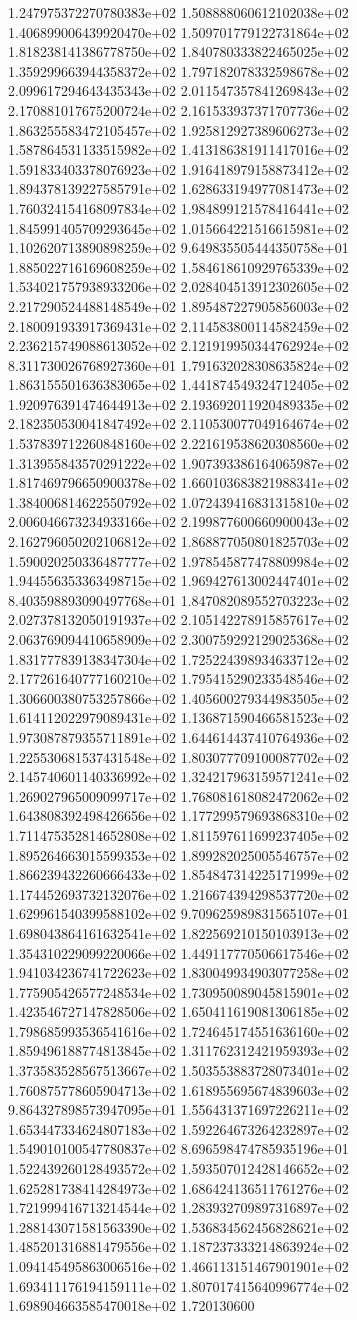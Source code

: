 1.247975372270780383e+02	1.508888060612102038e+02	1.406899006439920470e+02	1.509701779122731864e+02	1.818238141386778750e+02	1.840780333822465025e+02	1.359299663944358372e+02	1.797182078332598678e+02	2.099617294643435343e+02	2.011547357841269843e+02	2.170881017675200724e+02	2.161533937371707736e+02	1.863255583472105457e+02	1.925812927389606273e+02	1.587864531133515982e+02	1.413186381911417016e+02	1.591833403378076923e+02	1.916418979158873412e+02	1.894378139227585791e+02	1.628633194977081473e+02	1.760324154168097834e+02	1.984899121578416441e+02	1.845991405709293645e+02	1.015664221516615981e+02	1.102620713890898259e+02	9.649835505444350758e+01	1.885022716169608259e+02	1.584618610929765339e+02	1.534021757938933206e+02	2.028404513912302605e+02	2.217290524488148549e+02	1.895487227905856003e+02	2.180091933917369431e+02	2.114583800114582459e+02	2.236215749088613052e+02	2.121919950344762924e+02	8.311730026768927360e+01	1.791632028308635824e+02	1.863155501636383065e+02	1.441874549324712405e+02	1.920976391474644913e+02	2.193692011920489335e+02	2.182350530041847492e+02	2.110530077049164674e+02	1.537839712260848160e+02	2.221619538620308560e+02	1.313955843570291222e+02	1.907393386164065987e+02	1.817469796650900378e+02	1.660103683821988341e+02	1.384006814622550792e+02	1.072439416831315810e+02	2.006046673234933166e+02	2.199877600660900043e+02	2.162796050202106812e+02	1.868877050801825703e+02	1.590020250336487777e+02	1.978545877478809984e+02	1.944556353363498715e+02	1.969427613002447401e+02	8.403598893090497768e+01	1.847082089552703223e+02	2.027378132050191937e+02	2.105142278915857617e+02	2.063769094410658909e+02	2.300759292129025368e+02	1.831777839138347304e+02	1.725224398934633712e+02	2.177261640777160210e+02	1.795415290233548546e+02	1.306600380753257866e+02	1.405600279344983505e+02	1.614112022979089431e+02	1.136871590466581523e+02	1.973087879355711891e+02	1.644614437410764936e+02	1.225530681537431548e+02	1.803077709100087702e+02	2.145740601140336992e+02	1.324217963159571241e+02	1.269027965009099717e+02	1.768081618082472062e+02	1.643808392498426656e+02	1.177299579693868310e+02	1.711475352814652808e+02	1.811597611699237405e+02	1.895264663015599353e+02	1.899282025005546757e+02	1.866239432260666433e+02	1.854847314225171999e+02	1.174452693732132076e+02	1.216674394298537720e+02	1.629961540399588102e+02	9.709625989831565107e+01	1.698043864161632541e+02	1.822569210150103913e+02	1.354310229099220066e+02	1.449117770506617546e+02	1.941034236741722623e+02	1.830049934903077258e+02	1.775905426577248534e+02	1.730950089045815901e+02	1.423546727147828506e+02	1.650411619081306185e+02	1.798685993536541616e+02	1.724645174551636160e+02	1.859496188774813845e+02	1.311762312421959393e+02	1.373583528567513667e+02	1.503553883728073401e+02	1.760875778605904713e+02	1.618955695674839603e+02	9.864327898573947095e+01	1.556431371697226211e+02	1.653447334624807183e+02	1.592264673264232897e+02	1.549010100547780837e+02	8.696598474785935196e+01	1.522439260128493572e+02	1.593507012428146652e+02	1.625281738414284973e+02	1.686424136511761276e+02	1.721999416713214544e+02	1.283932709897316897e+02	1.288143071581563390e+02	1.536834562456828621e+02	1.485201316881479556e+02	1.187237333214863924e+02	1.094145495863006516e+02	1.466113151467901901e+02	1.693411176194159111e+02	1.807017415640996774e+02	1.698904663585470018e+02	1.720130600